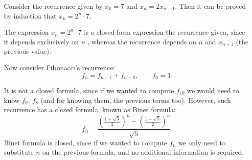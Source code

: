 \documentclass[12pt]{article}
\begin{document}
Consider the recurrence given by
$x_0 = 7$ and $x_n = 2 x_{n-1}$. Then it can be proved by induction that
$x_n = 2^n\cdot 7$.

The expression $x_n = 2^n \cdot 7$ is a closed form expression the  recurrence given, since it depends exclusively on $n$ , whereas the recurrence depends on $n$ and $x_{n-1}$ (the previous value).
\bigskip

Now consider Fibonacci's recurrence:
\[
f_n = f_{n-1}+ f_{n-2},\qquad f_0 = 1.
\]

It is not a closed formula, since if we wanted to compute $f_{10}$ we would need to know $f_9$, $f_8$ (and for knowing them, the previous terms too). However, such recurrence has a closed formula, known as Binet formula:
\[
f_n = \frac{\left(\frac{1+\sqrt5}{2}\right)^n -\left(\frac{1-\sqrt5}{2}\right)^n }{\sqrt5}.
\]
Binet formula is closed, since if we wanted to compute $f_n$ we only need to substitute $n$ on the previous formula, and no additional information is required.
\end{document}
